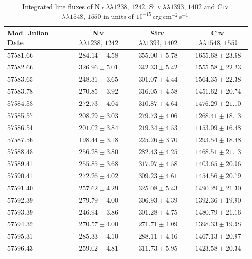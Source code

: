 \begin{table}[h]
	\centering
	\caption[Integrated line fluxes of the high-ionization UV emission lines]{Integrated line fluxes of N\,\textsc{v}\,$\lambda\lambda 1238,\,1242$, Si\,\textsc{iv}\,$\lambda\lambda 1393,\,1402$ and C\,\textsc{iv}\,$\lambda\lambda 1548,\,1550$ in units of $10^{-15}$\,erg\,cm$^{-2}$\,s$^{-1}$.}
	\begin{tabular}{lccc}
		\hline\hline
		Mod. Julian Date & N\,\textsc{v}\,$\lambda\lambda 1238,\,1242$ & Si\,\textsc{iv}\,$\lambda\lambda 1393,\,1402$ & C\,\textsc{iv}\,$\lambda\lambda 1548,\,1550$ \\
		\hline
		57581.66 & $284.14 \pm 4.58$ & $355.00 \pm 5.78$ & $1655.68 \pm 23.68$ \\
		57582.66 & $326.96 \pm 5.01$ & $342.33 \pm 5.42$ & $1555.58 \pm 22.23$ \\
		57583.65 & $248.31 \pm 3.65$ & $301.07 \pm 4.44$ & $1564.35 \pm 22.38$ \\
		57583.78 & $270.85 \pm 3.92$ & $316.05 \pm 4.58$ & $1451.62 \pm 20.74$ \\
		57584.58 & $272.73 \pm 4.04$ & $310.87 \pm 4.64$ & $1476.29 \pm 21.10$ \\
		57585.57 & $208.29 \pm 3.03$ & $279.73 \pm 4.06$ & $1268.41 \pm 18.13$ \\
		57586.54 & $201.02 \pm 3.84$ & $219.34 \pm 4.53$ & $1153.09 \pm 16.48$ \\
		57587.56 & $198.44 \pm 3.18$ & $225.26 \pm 3.70$ & $1293.54 \pm 18.48$ \\
		57588.48 & $256.28 \pm 3.80$ & $282.43 \pm 4.25$ & $1468.51 \pm 21.13$ \\
		57589.41 & $255.85 \pm 3.68$ & $317.97 \pm 4.58$ & $1403.65 \pm 20.06$ \\
		57590.41 & $272.26 \pm 4.02$ & $309.23 \pm 4.61$ & $1454.56 \pm 20.79$ \\
		57591.40 & $257.62 \pm 4.29$ & $325.08 \pm 5.43$ & $1490.29 \pm 21.30$ \\
		57592.39 & $279.79 \pm 4.00$ & $306.93 \pm 4.39$ & $1392.36 \pm 19.90$ \\
		57593.39 & $246.94 \pm 3.86$ & $301.28 \pm 4.75$ & $1480.79 \pm 21.16$ \\
		57594.32 & $270.57 \pm 4.00$ & $271.71 \pm 4.09$ & $1398.33 \pm 19.98$ \\
		57595.31 & $285.33 \pm 4.10$ & $288.11 \pm 4.16$ & $1467.13 \pm 20.97$ \\
		57596.43 & $259.02 \pm 4.81$ & $311.73 \pm 5.95$ & $1423.58 \pm 20.34$ \\

\end{tabular}
\end{table}
